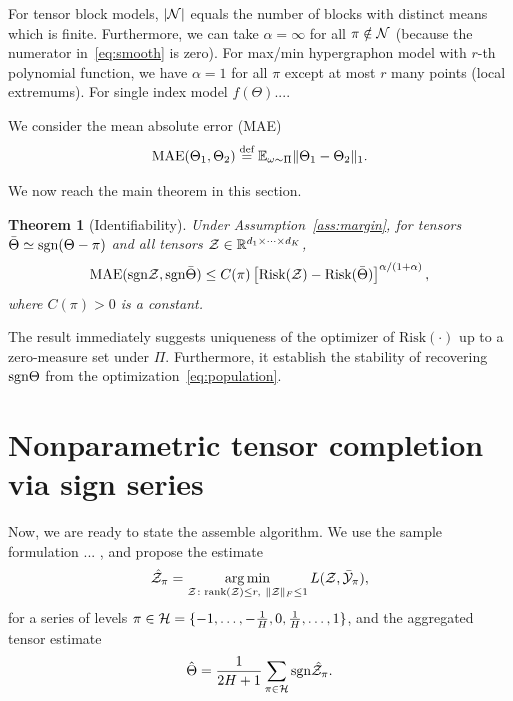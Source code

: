 \documentclass{article}
\theoremstyle{plain}
\newtheorem{thm}{Theorem}[section]
\theoremstyle{definition}
\def\sign{\textup{sgn}}
\def\caliP{\mathscr{P}_{\textup{sgn}}}
\begin{document}
For tensor block models, $|\mathcal{N}|$ equals the number of blocks with distinct means which is finite. Furthermore, we can take $\alpha= \infty$ for all $\pi \notin \mathcal{N}$ (because the numerator in~\eqref{eq:smooth} is zero). For max/min hypergraphon model with $r$-th polynomial function, we have $\alpha=1$ for all $\pi$ except at most $r$ many points (local extremums). For single index model $f(\Theta)$....

We consider the mean absolute error (MAE)
\[
\text{MAE}(\Theta_1, \Theta_2)\stackrel{\text{def}}{=}\mathbb{E}_{\omega\sim \Pi}\lVert\Theta_1-\Theta_2\rVert_1.
\]

We now reach the main theorem in this section. 
\begin{thm}[Identifiability] Under Assumption~\ref{ass:margin}, for tensors $\bar \Theta \simeq \sign(\Theta-\pi)$ and all tensors $\mathcal{Z}\in\mathbb{R}^{d_1\times \cdots \times d_K}$,
\[
\textup{MAE}(\sign \tZ, \sign \bar \Theta) \leq C(\pi)\left[\textup{Risk}(\tZ)-\textup{Risk}( \bar \Theta)\right]^{\alpha/(1+\alpha)},
\]
where $C(\pi)>0$ is a constant. 
\end{thm}
The result immediately suggests uniqueness of the optimizer of $\text{Risk}(\cdot)$ up to a zero-measure set under $\Pi$. Furthermore, it establish the stability of recovering $\sign \Theta$ from the optimization~\eqref{eq:population}.  
\section{Nonparametric tensor completion via sign series}

Now, we are ready to state the assemble algorithm. We use the sample formulation ... , and propose the estimate
\begin{equation}\label{eq:estimate}
\hat \tZ_\pi = \argmin_{\tZ\colon \text{rank}(\tZ)\leq r, \ \FnormSize{}{\tZ}\leq 1} L(\tZ,\bar \tY_\pi),
\end{equation}
for a series of levels $\pi \in \mathcal{H}=\{-1,\ldots,-{1\over H}, 0, {1\over H},\ldots,1\}$, and the aggregated tensor estimate
\[
\hat \Theta = {1\over 2H+1}\sum_{\pi \in \tH}\sign{\hat \tZ_\pi}.
\]
\end{document}
